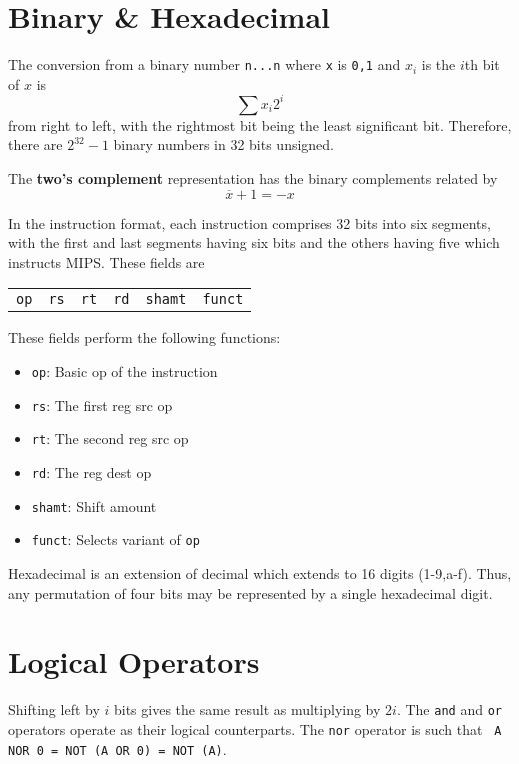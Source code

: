 \documentclass{tufte-book}
\begin{document}
\section{Binary \& Hexadecimal}

The conversion from a binary number \verb|n...n| where \verb|x| is \verb|0,1| and $x_i$ is the $i$th bit of $x$ is \begin{equation}
  \sum x_i 2^i
\end{equation}
from right to left, with the rightmost bit being the least significant bit. Therefore, there are $2^{32}-1$ binary numbers in 32 bits unsigned.

\bigskip
The \textbf{two's complement} representation has the binary complements related by \begin{equation}
  \overline{x} + 1 = -x
\end{equation}

In the instruction format, each instruction comprises 32 bits into six segments, with the first and last segments having six bits and the others having five which instructs MIPS. These fields are
\begin{center}
  \begin{tabular}{cccccc}
    \verb|op| & \verb|rs| & \verb|rt| & \verb|rd| & \verb|shamt| & \verb|funct|
  \end{tabular}
\end{center}
These fields perform the following functions:
\begin{itemize}
  \item \verb|op|: Basic op of the instruction
  \item \verb|rs|: The first reg src op
  \item \verb|rt|: The second reg src op
  \item \verb|rd|: The reg dest op
  \item \verb|shamt|: Shift amount
  \item \verb|funct|: Selects variant of \verb|op|
\end{itemize}

Hexadecimal is an extension of decimal which extends to 16 digits (1-9,a-f). Thus, any permutation of four bits may be represented by a single hexadecimal digit.

\section{Logical Operators}
Shifting left by $i$ bits gives the same result as multiplying by $2i$. The \verb|and| and \verb|or| operators operate as their logical counterparts. The \verb|nor| operator is such that \verb| A NOR 0 = NOT (A OR 0) = NOT (A)|.
\end{document}
